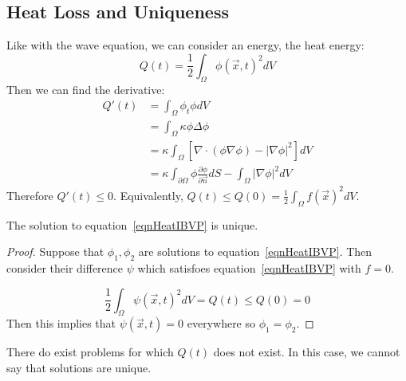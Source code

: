 \documentclass[../Main.tex]{subfiles}
\begin{document}
\subsection{Heat Loss and Uniqueness}
Like with the wave equation, we can consider an energy, the heat energy:
\begin{equation*}
    Q(t) = \frac12 \int_{\Omega} \phi(\vec{x}, t)^2 dV
\end{equation*}
Then we can find the derivative:
\begin{align*}
    Q'(t) &= \int_{\Omega} \phi_t \phi dV \\
    &= \int_{\Omega} \kappa \phi \Delta \phi \\
    &= \kappa \int_{\Omega} \left[\nabla \cdot (\phi \nabla \phi) - |\nabla \phi|^2\right]dV \\
    &= \kappa \int_{\partial \Omega} \phi \frac{\partial \phi}{\partial \vec{n}} dS  - \int_{\Omega} |\nabla \phi|^2 dV 
\end{align*}
Therefore $Q'(t) \leq 0$. Equivalently, $Q(t) \leq Q(0) = \frac{1}{2} \int_\Omega f(\vec{x})^2 dV$.
\begin{proposition}
    The solution to equation~\ref{eqnHeatIBVP} is unique.
    \label{propHeatUnique}
\end{proposition}
\begin{proof}
    Suppose that $\phi_1, \phi_2$ are solutions to equation~\ref{eqnHeatIBVP}. Then consider their difference $\psi$ which satisfoes equation~\ref{eqnHeatIBVP} with $f = 0$.

    \begin{equation*}
        \frac12 \int_\Omega \psi(\vec{x}, t)^2 dV = Q(t) \leq Q(0) = 0
    \end{equation*}
    Then this implies that $\psi(\vec{x}, t) = 0$ everywhere so $\phi_1 = \phi_2$.
\end{proof}
\begin{remark}
    There do exist problems for which $Q(t)$ does not exist. In this case, we cannot say that solutions are unique.
\end{remark}
\end{document}

